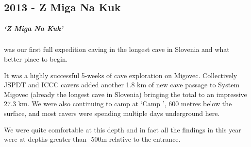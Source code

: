 \begin{tcolorbox}
	\chapter{2013 - Z Miga Na Kuk}
	\paragraph{`Z Miga Na Kuk'} was our first full expedition caving in the longest cave in Slovenia and what better place to begin. 

It was a highly successful 5-weeks of cave exploration on Migovec. Collectively JSPDT and ICCC cavers added another 1.8 km of new cave passage to System Migovec (already the longest cave in Slovenia) bringing the total to an impressive 27.3 km. We were also continuing to camp at `Camp \protect{}', 600 metres below the surface, and most cavers were spending multiple days underground here. 

We were quite comfortable at this depth and in fact all the findings in  this year were at depths greater than -500m relative to the entrance.

\end{tcolorbox}
\BgThispage
